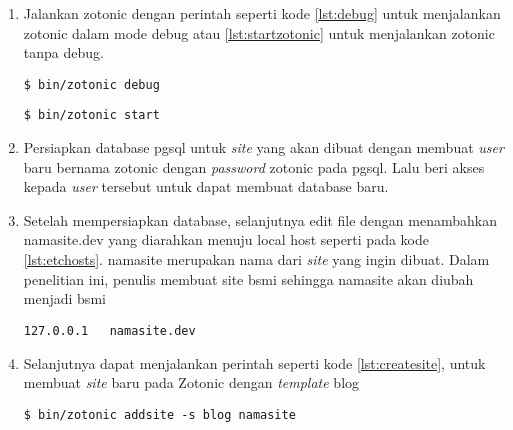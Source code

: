 \begin{enumerate}
	\item Jalankan zotonic dengan perintah seperti kode \ref{lst:debug} untuk menjalankan zotonic dalam mode debug atau \ref{lst:startzotonic} untuk menjalankan zotonic tanpa debug.
	
	\begin{minipage}{\linewidth}
		\begin{lstlisting}[caption={Perintah untuk menjalankan Zotonic pada mode debug},label={lst:debug}]
		$ bin/zotonic debug
		\end{lstlisting}
	\end{minipage}

	\begin{minipage}{\linewidth}
		\begin{lstlisting}[caption={Perintah untuk menjalankan Zotonic tanpa mode debug},label={lst:startzotonic}]
		$ bin/zotonic start
		\end{lstlisting}
	\end{minipage}

	\item Persiapkan database pgsql untuk \textit{site} yang akan dibuat dengan membuat \textit{user} baru bernama zotonic dengan \textit{password} zotonic pada pgsql. Lalu beri akses kepada \textit{user} tersebut untuk dapat membuat database baru.
	
	\item Setelah mempersiapkan database, selanjutnya edit file  dengan menambahkan namasite.dev yang diarahkan menuju local host seperti pada kode \ref{lst:etchosts}. namasite merupakan nama dari \textit{site} yang ingin dibuat. Dalam penelitian ini, penulis membuat site bsmi sehingga namasite akan diubah menjadi bsmi
	\begin{minipage}{\linewidth}
		\begin{lstlisting}[caption={Configurasi file /etc/hosts},label={lst:etchosts}]
		127.0.0.1   namasite.dev
		\end{lstlisting}
	\end{minipage}

	\item Selanjutnya dapat menjalankan perintah seperti kode \ref{lst:createsite}, untuk membuat \textit{site} baru pada Zotonic dengan \textit{template} blog
	\begin{minipage}{\linewidth}
		\begin{lstlisting}[caption={Perintah untuk membuat \textit{site} baru pada Zotonic},label={lst:createsite}]
		$ bin/zotonic addsite -s blog namasite
		\end{lstlisting}
	\end{minipage}


\end{enumerate}

